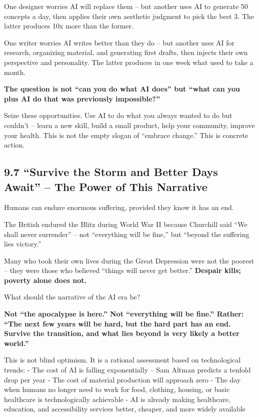 One designer worries AI will replace them -- but another uses AI to
generate 50 concepts a day, then applies their own aesthetic judgment to
pick the best 3. The latter produces 10x more than the former.

One writer worries AI writes better than they do -- but another uses AI
for research, organizing material, and generating first drafts, then
injects their own perspective and personality. The latter produces in
one week what used to take a month.

\textbf{The question is not ``can you do what AI does'' but ``what can
you plus AI do that was previously impossible?''}

Seize these opportunities. Use AI to do what you always wanted to do but
couldn't -- learn a new skill, build a small product, help your
community, improve your health. This is not the empty slogan of
``embrace change.'' This is concrete action.

\subsection{9.7 ``Survive the Storm and Better Days Await'' -- The Power
of This
Narrative}\label{survive-the-storm-and-better-days-await-the-power-of-this-narrative}

Humans can endure enormous suffering, provided they know it has an end.

The British endured the Blitz during World War II because Churchill said
``We shall never surrender'' -- not ``everything will be fine,'' but
``beyond the suffering lies victory.''

Many who took their own lives during the Great Depression were not the
poorest -- they were those who believed ``things will never get
better.'' \textbf{Despair kills; poverty alone does not.}

What should the narrative of the AI era be?

\textbf{Not ``the apocalypse is here.'' Not ``everything will be fine.''
Rather: ``The next few years will be hard, but the hard part has an end.
Survive the transition, and what lies beyond is very likely a better
world.''}

This is not blind optimism. It is a rational assessment based on
technological trends: - The cost of AI is falling exponentially -- Sam
Altman predicts a tenfold drop per year - The cost of material
production will approach zero - The day when humans no longer need to
work for food, clothing, housing, or basic healthcare is technologically
achievable - AI is already making healthcare, education, and
accessibility services better, cheaper, and more widely available

